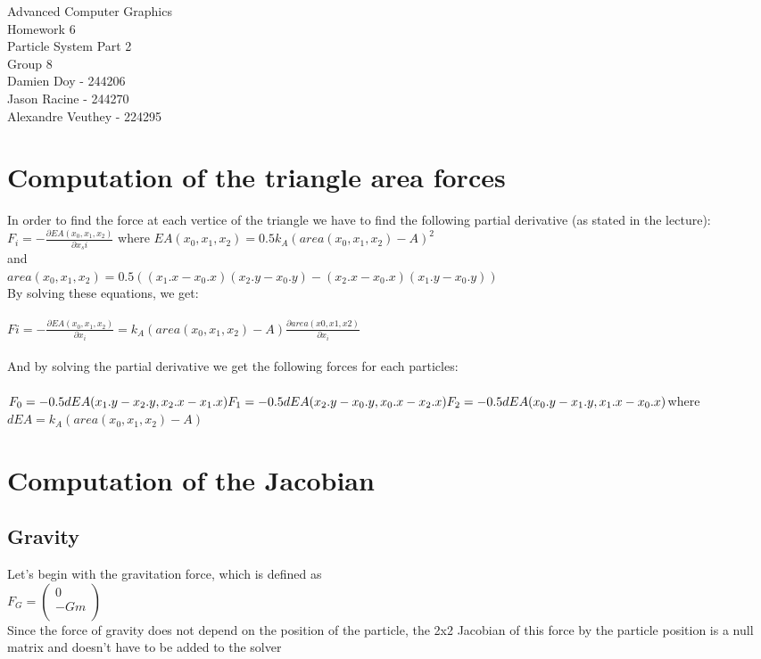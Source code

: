 \documentclass[10pt,a4paper]{report}
\begin{document}
{\LARGE \center Advanced Computer Graphics \\ Homework 6\\ Particle System Part 2\\}
{\large \center Group 8\\ Damien Doy - 244206\\
Jason Racine - 244270\\
Alexandre Veuthey - 224295\\
}

\section*{Computation of the triangle area forces}
In order to find the force at each vertice of the triangle we have to find the following partial derivative (as stated in the lecture):\\
$F_i=-\frac{\partial EA(x_0,x_1,x_2)}{\partial x_si}$ 
where 
$EA(x_0,x_1,x_2)=0.5k_A(area(x_0,x_1,x_2)-A)^2$\\
and \\
$area(x_0,x_1,x_2)=0.5((x_1.x-x_0.x)(x_2.y-x_0.y)-(x_2.x-x_0.x)(x_1.y-x_0.y))$\\
By solving these equations, we get:\\\\
$Fi=-\frac{\partial EA(x_0,x_1,x_2)}{\partial x_i}=k_A(area(x_0,x_1,x_2)-A)
\frac {\partial area(x0,x1,x2)}{\partial x_i}$\\\\
And by solving the partial derivative we get the following forces for each particles:\\\\
$F_0=-0.5dEA(x_1.y-x_2.y, x_2.x-x_1.x)\\
F_1=-0.5dEA(x_2.y-x_0.y, x_0.x-x_2.x)\\
F_2=-0.5dEA(x_0.y-x_1.y, x_1.x-x_0.x)\\
$where $dEA=k_A(area(x_0,x_1,x_2)-A)$

\section*{Computation of the Jacobian}

\subsection*{Gravity}
Let's begin with the gravitation force, which is defined as\\
$
F_G=\begin{pmatrix}
0 \\
-Gm \\
\end{pmatrix}
$\\
Since the force of gravity does not depend on the position of the particle, the 2x2 Jacobian
of this force by the particle position is a null matrix and doesn't have to be added to the solver\\
\end{document}
